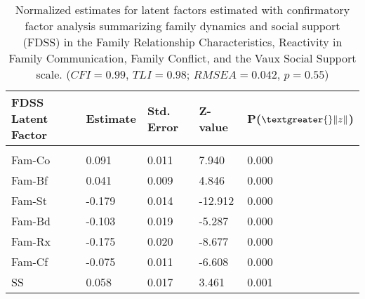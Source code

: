 \documentclass[utf8]{article}
\begin{document}
\begin{table}[]
\begin{tabular}{lllll}
FDSS Latent Factor & Estimate & Std. Error & Z-value & P($\textgreater{}\|z\|$) \\ \hline
                   &          &            &         &                          \\
Fam-Co             & 0.091    & 0.011      & 7.940   & 0.000                    \\
Fam-Bf             & 0.041    & 0.009      & 4.846   & 0.000                    \\
Fam-St             & -0.179   & 0.014      & -12.912 & 0.000                    \\
Fam-Bd             & -0.103   & 0.019      & -5.287  & 0.000                    \\
Fam-Rx             & -0.175   & 0.020      & -8.677  & 0.000                    \\
Fam-Cf             & -0.075   & 0.011      & -6.608  & 0.000                    \\
SS                 & 0.058    & 0.017      & 3.461   & 0.001                   
\end{tabular}
\caption{Normalized estimates for latent factors estimated with confirmatory factor analysis summarizing family dynamics and social support (FDSS) in the Family Relationship Characteristics, Reactivity in Family Communication, Family Conflict, and the Vaux Social Support scale. ($CFI=0.99$, $TLI=0.98$; $RMSEA=0.042$, $p=0.55$)\label{tab:5}}
\end{table}
\end{document}
